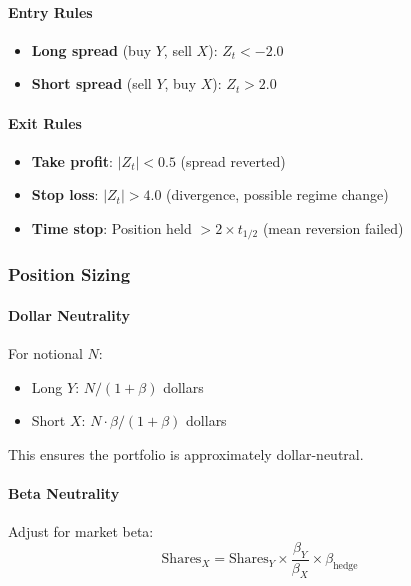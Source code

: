\paragraph{Entry Rules}

\begin{itemize}
  \item \textbf{Long spread} (buy $Y$, sell $X$): $Z_t < -2.0$
  \item \textbf{Short spread} (sell $Y$, buy $X$): $Z_t > 2.0$
\end{itemize}

\paragraph{Exit Rules}

\begin{itemize}
  \item \textbf{Take profit}: $|Z_t| < 0.5$ (spread reverted)
  \item \textbf{Stop loss}: $|Z_t| > 4.0$ (divergence, possible regime change)
  \item \textbf{Time stop}: Position held $> 2 \times t_{1/2}$ (mean reversion failed)
\end{itemize}

\subsubsection{Position Sizing}

\paragraph{Dollar Neutrality}

For notional $N$:
\begin{itemize}
  \item Long $Y$: $N / (1 + \beta)$ dollars
  \item Short $X$: $N \cdot \beta / (1 + \beta)$ dollars
\end{itemize}

This ensures the portfolio is approximately dollar-neutral.

\paragraph{Beta Neutrality}

Adjust for market beta:
\[
\text{Shares}_X = \text{Shares}_Y \times \frac{\beta_Y}{\beta_X} \times \beta_{\text{hedge}}
\]

